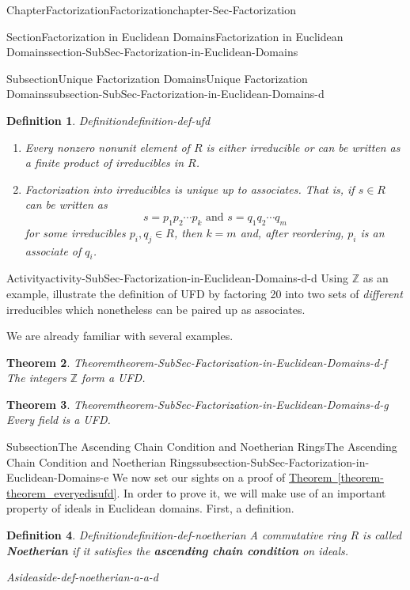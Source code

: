 \documentclass[oneside,10pt,]{book}
\newcommand{\xreffont}{\relax}
\newcommand{\terminology}[1]{\textbf{#1}}
\numberwithin{equation}{section}
\def\Z{{\mathbb Z}}
\newtheorem{theorem}{Theorem}[section]
\newtheorem{definition}[theorem]{Definition}
\begin{document}
\begin{chapterptx}{Chapter}{Factorization}{}{Factorization}{}{}{chapter-Sec-Factorization}
\begin{sectionptx}{Section}{Factorization in Euclidean Domains}{}{Factorization in Euclidean Domains}{}{}{section-SubSec-Factorization-in-Euclidean-Domains}
\begin{subsectionptx}{Subsection}{Unique Factorization Domains}{}{Unique Factorization Domains}{}{}{subsection-SubSec-Factorization-in-Euclidean-Domains-d}
\begin{definition}{Definition}{}{definition-def-ufd}
\begin{enumerate}
\item{}Every nonzero nonunit element of \(R\) is either irreducible or can be written as a finite product of irreducibles in \(R\).%
\item{}Factorization into irreducibles is unique up to associates. That is, if \(s\in R\) can be written as%
\begin{equation*}
s = p_1 p_2 \cdots p_k \text{ and }  s = q_1 q_2 \cdots q_m
\end{equation*}
for some irreducibles \(p_i, q_j\in R\), then \(k=m\) and, after reordering, \(p_i\) is an associate of \(q_i\).%
\end{enumerate}
%
\end{definition}
\begin{activity}{Activity}{}{activity-SubSec-Factorization-in-Euclidean-Domains-d-d}%
Using \(\Z\) as an example, illustrate the definition of UFD by factoring 20 into two sets of \emph{different} irreducibles which nonetheless can be paired up as associates.%
\end{activity}%
We are already familiar with several examples.%
\begin{theorem}{Theorem}{}{}{theorem-SubSec-Factorization-in-Euclidean-Domains-d-f}%
The integers \(\Z\) form a UFD.%
\end{theorem}
\begin{theorem}{Theorem}{}{}{theorem-SubSec-Factorization-in-Euclidean-Domains-d-g}%
Every field is a UFD.%
\end{theorem}
\end{subsectionptx}
%
%
\typeout{************************************************}
\typeout{************************************************}
%
\begin{subsectionptx}{Subsection}{The Ascending Chain Condition and Noetherian Rings}{}{The Ascending Chain Condition and Noetherian Rings}{}{}{subsection-SubSec-Factorization-in-Euclidean-Domains-e}
We now set our sights on a proof of \hyperref[theorem-theorem_everyedisufd]{Theorem~{\xreffont\ref{theorem-theorem_everyedisufd}}}. In order to prove it, we will make use of an important property of ideals in Euclidean domains. First, a definition.%
\begin{definition}{Definition}{}{definition-def-noetherian}%
A commutative ring \(R\) is called \terminology{Noetherian} if it satisfies the \terminology{ascending chain condition} on ideals. \begin{aside}{Aside}{}{aside-def-noetherian-a-a-d}%

\end{aside}
\end{definition}
\end{subsectionptx}
\end{sectionptx}
\end{chapterptx}
\end{document}
